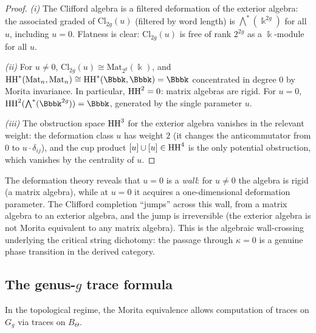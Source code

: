 \begin{proof}
\emph{(i)} The Clifford algebra is a filtered deformation of the
exterior algebra: the associated graded of $\mathrm{Cl}_{2g}(u)$
(filtered by word length) is $\bigwedge^*(\Bbbk^{2g})$ for all $u$,
including $u = 0$. Flatness is clear: $\mathrm{Cl}_{2g}(u)$ is free
of rank $2^{2g}$ as a $\Bbbk$-module for all $u$.

\emph{(ii)} For $u \neq 0$, $\mathrm{Cl}_{2g}(u) \cong
\mathrm{Mat}_{2^g}(\Bbbk)$, and $\HH^*(\mathrm{Mat}_n, \mathrm{Mat}_n)
\cong \HH^*(\Bbbk, \Bbbk) = \Bbbk$ concentrated in degree $0$ by
Morita invariance. In particular, $\operatorname{HH}^2 = 0$: matrix algebras are
rigid. For $u = 0$, $\HH^2(\bigwedge^*(\Bbbk^{2g})) = \Bbbk$,
generated by the single parameter $u$.

\emph{(iii)} The obstruction space $\operatorname{HH}^3$ for the exterior algebra
vanishes in the relevant weight: the deformation class $u$ has weight
$2$ (it changes the anticommutator from $0$ to $u \cdot \delta_{ij}$),
and the cup product $[u] \cup [u] \in \operatorname{HH}^4$ is the only potential
obstruction, which vanishes by the centrality of $u$.
\end{proof}

\begin{remark}[The wall-crossing at $u = 0$]
The deformation theory reveals that $u = 0$ is a \emph{wall}: for
$u \neq 0$ the algebra is rigid (a matrix algebra), while at $u = 0$
it acquires a one-dimensional deformation parameter. The Clifford
completion ``jumps'' across this wall, from a matrix algebra to an
exterior algebra, and the jump is irreversible (the exterior algebra
is not Morita equivalent to any matrix algebra). This is the algebraic
wall-crossing underlying the critical string dichotomy: the passage
through $\kappa = 0$ is a genuine phase transition in the derived
category.
\end{remark}

%
%

\subsection{The genus-$g$ trace formula}

In the topological regime, the Morita equivalence allows computation of
traces on $G_g$ via traces on $B_\Theta$.

